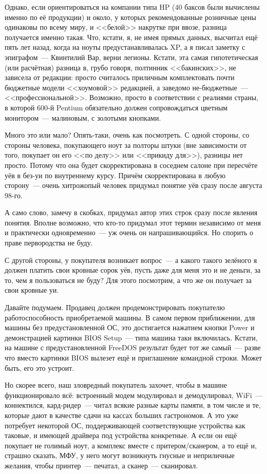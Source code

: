 Однако, если ориентироваться на компании типа HP (40 баксов были вычислены именно по её продукции) и около, у которых рекомендованные розничные цены одинаковы по всему миру, и <<белой>> накрутке при ввозе, разница получается именно такая. Что, кстати, я, не имея прямых данных, высчитал ещё пять лет назад, когда на ноуты предустанавливалась XP, а я писал заметку с эпиграфом~--- Квинтилий Вар, верни легионы. Кстати, эта самая гипотетическая (или расчётная) разница в, грубо говоря, полтинник <<бакинских>>, не зависела от редакции: просто считалось приличным комплектовать почти бюджетные модели <<хоумовой>> редакцией, а заведомо не-бюджетные~--- <<профессиональной>>. Возможно, просто в соответствии с реалиями страны, в которой 600-й Pentium обязательно должен сопровождаться цветным монитором~--- малиновым, с золотыми кнопками.

Много это или мало? Опять-таки, очень как посмотреть. С одной стороны, со стороны человека, покупающего ноут за полторы штуки (вне зависимости от того, покупает он его <<по делу>> или <<прикиду для>>), разницы нет просто. Потому что она будет скорректирована в соседнем салоне при пересчёте уёв в без-уи по внутреннему курсу. Причём скорректирована в любую сторону~--- очень хитрожопый человек придумал понятие уёв сразу после августа 98-го.

А само слово, замечу в скобках, придумал автор этих строк сразу после явления понятия. Вполне возможно, что кто-то придумал этот термин независимо от меня и практически одновременно~--- уж очень он напрашивающийся. Но спорить о праве первородства не буду.

С другой стороны, у покупателя возникает вопрос~--- а какого такого зелёного я должен платить свои кровные сорок уёв, пусть даже для меня это и не деньги, за то, чем я пользоваться не буду? Для этого посмотрим, а что же он получает за свои кровные уи.

Давайте подумаем. Продавец должен продемонстрировать покупателю работоспособность приобретаемой машины. В самом первом приближении, для машины без предустановленной ОС, это достигается нажатием кнопки Power и демонстрацией картинки BIOS Setup~--- типа машина таки включилась. Кстати, на машине с предустановленной FreeDOS результат будет тот же самый~--- разве что вместо картинки BIOS вылезет ещё и приглашение командной строки. Может быть, его это устроит.

Но скорее всего, наш зловредный покупатель захочет, чтобы в машине функционировало всё: встроенный модем модулировал и демодулировал, WiFi~--- коннектился, кард-ридер~--- читал всякие разные карты памяти, в том числе и те, которые дают в качестве сдачи на кассах больших гастрономов. А это уже потребует некоторой ОС, поддерживающей соответствующие устройства как таковые, и имеющей драйвера под устройства конкретные. А если он ещё покупает не голимый ноут, а комплекс вместе с притером/сканером, а то ещё и, страшно сказать, МФУ, у него могут возникнуть гнусные и неприличные желания, чтобы принтер~--- печатал, а сканер~--- сканировал.

